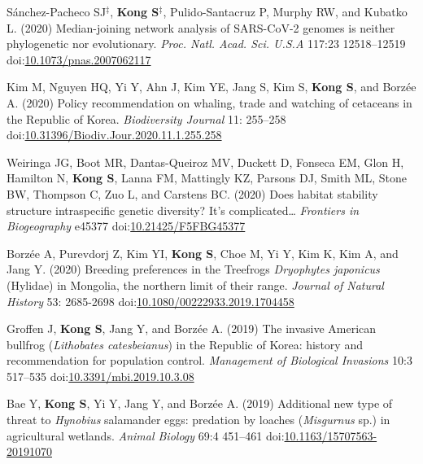 \documentclass[11pt,letterpaper,sans]{moderncv} %
\begin{document}
\begin{etaremune}
	\item  Sánchez-Pacheco SJ{$^\ddag$}, \textbf{Kong S}{$^\ddag$}, Pulido-Santacruz P, Murphy RW, and Kubatko L. (2020) Median-joining network analysis of SARS-CoV-2 genomes is neither phylogenetic nor evolutionary. \textit{Proc. Natl. Acad. Sci. U.S.A} 117:23 12518–12519 doi:\href{https://doi.org/10.1073/pnas.2007062117}{10.1073/pnas.2007062117}
	
	\item Kim M, Nguyen HQ, Yi Y, Ahn J, Kim YE, Jang S, Kim S, \textbf{Kong S}, and Borzée A. (2020) Policy recommendation on whaling, trade and watching of cetaceans in the Republic of Korea. \textit{Biodiversity Journal} 11: 255–258 doi:\href{https://doi.org/10.31396/Biodiv.Jour.2020.11.1.255.258}{10.31396/Biodiv.Jour.2020.11.1.255.258}

\pagebreak
	\item Weiringa JG, Boot MR,  Dantas-Queiroz MV, Duckett D, Fonseca EM, Glon H, Hamilton N, \textbf{Kong S}, Lanna FM, Mattingly KZ, Parsons DJ, Smith ML, Stone BW, Thompson C, Zuo L, and Carstens BC. (2020) Does habitat stability structure intraspecific genetic diversity? It’s complicated… \textit{Frontiers in Biogeography} e45377 doi:\href{https://doi.org/10.21425/F5FBG45377}{10.21425/F5FBG45377}
	
	\item Borzée A, Purevdorj Z, Kim YI, \textbf{Kong S}, Choe M, Yi Y, Kim K, Kim A, and Jang Y. (2020) Breeding preferences in the Treefrogs \textit{Dryophytes japonicus} (Hylidae) in Mongolia, the northern limit of their range. \textit{Journal of Natural History} 53: 2685-2698 doi:\href{https://doi.org/10.1080/00222933.2019.1704458}{10.1080/00222933.2019.1704458}
	
	\item Groffen J, \textbf{Kong S}, Jang Y, and Borzée A. (2019) The invasive American bullfrog (\textit{Lithobates catesbeianus}) in the Republic of Korea: history and recommendation for population control. \textit{Management of Biological Invasions} 10:3 517–535 doi:\href{https://doi.org/10.3391/mbi.2019.10.3.08}{10.3391/mbi.2019.10.3.08}
	
	\item Bae Y, \textbf{Kong S}, Yi Y, Jang Y, and Borzée A. (2019) Additional new type of threat to \textit{Hynobius} salamander eggs: predation by loaches (\textit{Misgurnus} sp.) in agricultural wetlands. \textit{Animal Biology} 69:4 451–461 doi:\href{https://doi.org/10.1163/15707563-20191070}{10.1163/15707563-20191070}
	

\end{etaremune}
\end{document}
